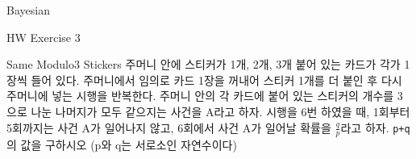 \begin{edXchapter}{Bayesian}
\begin{edXsection}{HW Exercise 3}
\begin{edXvertical}
\begin{edXproblem}{Same Modulo3 Stickers}
주머니 안에 스티커가 1개, 2개, 3개 붙어 있는 카드가 각가 1장씩 들어 있다. 주머니에서 임의로
카드 1장을 꺼내어 스티커 1개를 더 붙인 후 다시 주머니에 넣는 시행을 반복한다. 주머니 안의
각 카드에 붙어 있는 스티커의 개수를 3으로 나눈 나머지가 모두 같으지는 사건을 A라고 하자.
시행을 6번 하였을 때, 1회부터 5회까지는 사건 A가 일어나지 않고, 6회에서 사건 A가 일어날 
확률을 $\frac{q}{p}$라고 하자. {\tt\LARGE p+q}의 값을 구하시오 (p와 q는 서로소인 자연수이다)
\end{edXproblem}

\end{edXvertical}
\end{edXsection}
\end{edXchapter}
